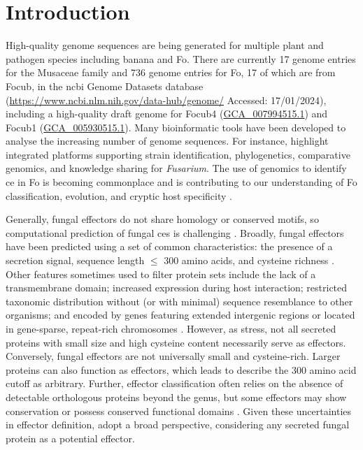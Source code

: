 \section{Introduction}
\label{sec:Chap3Intro}

High-quality genome sequences are being generated for multiple plant and pathogen species including banana and \ac{Fo}. There are currently 17 genome entries for the Musaceae family and 736 genome entries for \ac{Fo}, 17 of which are from \ac{Focub}, in the \ac{ncbi} Genome Datasets database (\href{https://www.ncbi.nlm.nih.gov/data-hub/genome/}{https://www.ncbi.nlm.nih.gov/data-hub/genome/} Accessed: 17/01/2024), including a high-quality draft genome for \ac{Focub4} \parencite{Warmington2019} (\href{https://www.ncbi.nlm.nih.gov/datasets/genome/GCA_007994515.1/}{GCA\_007994515.1}) and \ac{Focub1} \parencite{Asai2019} (\href{https://www.ncbi.nlm.nih.gov/datasets/genome/GCA_005930515.1/}{GCA\_005930515.1}). Many bioinformatic tools have been developed to analyse the increasing number of genome sequences. For instance, \textcite{Park2010} highlight integrated platforms supporting strain identification, phylogenetics, comparative genomics, and knowledge sharing for \textit{Fusarium}. The use of genomics to identify \acf{ce} in \ac{Fo} is becoming commonplace and is contributing to our understanding of \ac{Fo} classification, evolution, and cryptic host specificity \parencite{Dam2016, Dam2017, Simbaqueba2020, FoEC2, Westerhoven2023}. 

Generally, fungal effectors do not share homology or conserved motifs, so computational prediction of fungal \acp{ce} is challenging \parencite{Sperschneider2022, Todd2022}. Broadly, fungal effectors have been predicted using a set of common characteristics: the presence of a secretion signal, sequence length $\leq$ 300 amino acids, and cysteine richness \parencite{Sperschneider2015}. Other features sometimes used to filter protein sets include the lack of a transmembrane domain; increased expression during host interaction; restricted taxonomic distribution without (or with minimal) sequence resemblance to other organisms; and encoded by genes featuring extended intergenic regions or located in gene-sparse, repeat-rich chromosomes \parencite{Dalio2018, Todd2022}. However, as \textcite{LoPresti2015, Sperschneider2015} stress, not all secreted proteins with small size and high cysteine content necessarily serve as effectors. Conversely, fungal effectors are not universally small and cysteine-rich. Larger proteins can also function as effectors, which leads \textcite{LoPresti2015} to describe the 300 amino acid cutoff as arbitrary. Further, effector classification often relies on the absence of detectable orthologous proteins beyond the genus, but some effectors may show conservation or possess conserved functional domains \parencite{Jonge2010, Djamei2011, Mentlak2012}. Given these uncertainties in effector definition, \textcite{LoPresti2015} adopt a broad perspective, considering any secreted fungal protein as a potential effector. 

